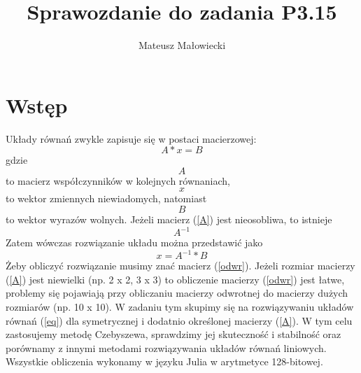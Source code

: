 \documentclass[a4paper]{article}
\author{Mateusz Małowiecki}
\title{Sprawozdanie do zadania P3.15}
\begin{document}
\maketitle
\section{Wstęp}
Układy równań zwykle zapisuje się w postaci macierzowej: 
\begin{equation}
\label{eq}
A*x = B
\end{equation}
gdzie 
\begin{equation}
\label{A}
A
\end{equation} to macierz współczynników w kolejnych równaniach, 
\begin{equation}
\label{x}
x
\end{equation} to wektor zmiennych niewiadomych, natomiast 
\begin{equation}
\label{B}
B
\end{equation} to wektor wyrazów wolnych. Jeżeli macierz (\ref{A}) 
jest nieosobliwa, to istnieje
\begin{equation}
\label{odwr}
A^{-1}
\end{equation}
Zatem wówczas rozwiązanie układu można przedstawić jako
\begin{equation}
\label{solution}
x = A^{-1}*B
\end{equation}
Żeby obliczyć rozwiązanie musimy znać macierz (\ref{odwr}). Jeżeli rozmiar macierzy (\ref{A}) jest niewielki (np. 2 x 2, 3 x 3) to obliczenie macierzy (\ref{odwr}) jest łatwe, problemy się pojawiają przy obliczaniu macierzy odwrotnej do macierzy dużych rozmiarów (np. 10 x 10). W zadaniu tym skupimy się na rozwiązywaniu układów równań (\ref{eq}) dla symetrycznej i dodatnio określonej macierzy (\ref{A}). W tym celu zastosujemy metodę Czebyszewa, sprawdzimy jej skuteczność i stabilność oraz porównamy z innymi metodami rozwiązywania układów równań liniowych. Wszystkie obliczenia wykonamy w języku Julia w arytmetyce 128-bitowej.
\end{document}
